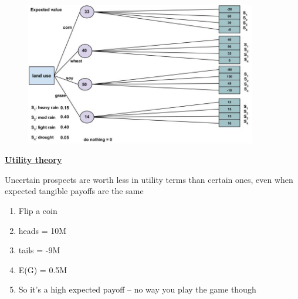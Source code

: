 \documentclass[aspectratio=1610,pdftex,dvipsnames,compress,xcolor={dvipsnames}]{beamer}
\begin{document}
\begin{frame}{}
    \begin{figure}
        \centering
        \includegraphics[width=0.90\textwidth]{land.use.expected.jpg}
    \end{figure}
\end{frame}


\begin{frame}[plain]{}
    \centering\LARGE\textbf{\href{https://uidaho.pressbooks.pub/riskassessment/chapter/utility-theory/}{Utility theory}}
\end{frame}


\addtocounter{framenumber}{-1}
\begin{frame}{Uncertain prospects are worth less in utility terms than certain ones, even when expected tangible payoffs are the same}
    \begin{enumerate}[series=outerlist,topsep=0pt,itemsep=21pt,leftmargin=*,label=(\arabic*)]
        \item[]Flip a coin    
        \item[]heads = 10M  
        \item[]tails = -9M  
        \item[]E(G) = 0.5M
        \item[]So it's a high expected payoff -- no way you play the game though
    \end{enumerate}
\end{frame}
\end{document}
